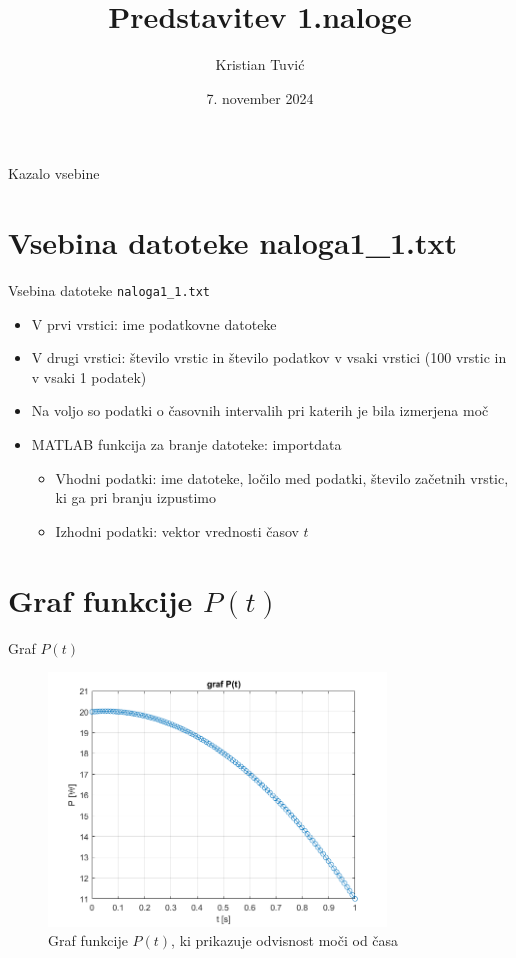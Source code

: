\documentclass{beamer}
\title{Predstavitev 1.naloge}
\author{Kristian Tuvić}
\institute{Univerza v Ljubljani}
\date{7. november 2024}
\begin{document}
\begin{frame}
    \titlepage
\end{frame}

\begin{frame}{Kazalo vsebine}
    \tableofcontents
\end{frame}

\section{Vsebina datoteke naloga1\_1.txt}
\begin{frame}{Vsebina datoteke \texttt{naloga1\_1.txt}}
    \begin{itemize}
        \item V prvi vrstici: ime podatkovne datoteke
        \item V drugi vrstici: število vrstic in število podatkov v vsaki vrstici (100 vrstic in v vsaki 1 podatek)
        \item Na voljo so podatki o časovnih intervalih pri katerih je bila izmerjena moč
        \item MATLAB funkcija za branje datoteke: importdata
            \begin{itemize}
                \item Vhodni podatki: ime datoteke, ločilo med podatki, število začetnih vrstic, ki ga pri branju izpustimo
                \item Izhodni podatki: vektor vrednosti časov \( t \)
            \end{itemize}
    \end{itemize}
\end{frame}

\section{Graf funkcije \( P(t) \)}
\begin{frame}{Graf \( P(t) \)}
    \begin{figure}
        \centering
        \includegraphics[width=0.8\textwidth]{graf_Pt.png}
        \caption{Graf funkcije \( P(t) \), ki prikazuje odvisnost moči od časa}
    \end{figure}
\end{frame}
\end{document}
